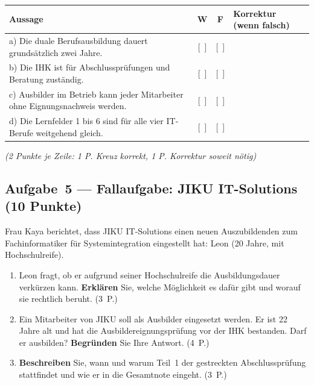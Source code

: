 \documentclass[11pt, a4paper]{article}
\begin{document}
\begin{center}
\begin{tabular}{p{7.5cm} c c p{4.5cm}}
\toprule
\textbf{Aussage} & \textbf{W} & \textbf{F} & \textbf{Korrektur (wenn falsch)}\\
\midrule
a) Die duale Berufsausbildung dauert grundsätzlich zwei Jahre. & {[~]} & {[~]} & \underline{\hspace{4cm}}\\[1.5em]
b) Die IHK ist für Abschlussprüfungen und Beratung zuständig. & {[~]} & {[~]} & \underline{\hspace{4cm}}\\[1.5em]
c) Ausbilder im Betrieb kann jeder Mitarbeiter ohne Eignungsnachweis werden. & {[~]} & {[~]} & \underline{\hspace{4cm}}\\[1.5em]
d) Die Lernfelder 1 bis 6 sind für alle vier IT-Berufe weitgehend gleich. & {[~]} & {[~]} & \underline{\hspace{4cm}}\\[1em]
\bottomrule
\end{tabular}
\end{center}
\textit{(2 Punkte je Zeile: 1 P. Kreuz korrekt, 1 P. Korrektur soweit nötig)}

\subsection*{Aufgabe~5 --- Fallaufgabe: JIKU IT-Solutions (10 Punkte)}

Frau Kaya berichtet, dass JIKU IT-Solutions einen neuen Auszubildenden zum Fachinformatiker
für Systemintegration eingestellt hat: Leon (20 Jahre, mit Hochschulreife).

\begin{enumerate}[label=(\alph*)]
  \item Leon fragt, ob er aufgrund seiner Hochschulreife die Ausbildungsdauer verkürzen kann. \textbf{Erklären} Sie, welche Möglichkeit es dafür gibt und worauf sie rechtlich beruht. \hfill (3~P.)

  \vspace{3cm}

  \item Ein Mitarbeiter von JIKU soll als Ausbilder eingesetzt werden. Er ist 22 Jahre alt und hat die Ausbildereignungsprüfung vor der IHK bestanden. Darf er ausbilden? \textbf{Begründen} Sie Ihre Antwort. \hfill (4~P.)

  \vspace{3.5cm}

  \item \textbf{Beschreiben} Sie, wann und warum Teil~1 der gestreckten Abschlussprüfung stattfindet und wie er in die Gesamtnote eingeht. \hfill (3~P.)

  \vspace{3cm}
\end{enumerate}
\end{document}
